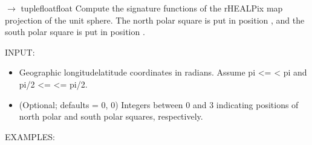 \documentclass[a4paper,12ptopenany,oneside,english]{sphinxmanual}
\begin{document}

\begin{fulllineitems}
\label{\detokenize{pj_rhealpix:rhealpixdggs.pj_rhealpix.rhealpix_sphere}}
\pysigstartsignatures
\pysiglinewithargsret
{}
{\sphinxparamcomma {}\sphinxparamcomma {}\sphinxparamcomma {}\sphinxparamcomma {}}
{{ $\rightarrow$ tuple\DUrole{p}{{[}}floatfloat\DUrole{p}{{]}}}}
\pysigstopsignatures
\sphinxAtStartPar
Compute the signature functions of the rHEALPix map projection of
the unit sphere.
The north polar square is put in position , and the
south polar square is put in position .

\sphinxAtStartPar
INPUT:
\begin{itemize}
\item {} 
\sphinxAtStartPar
{} \sphinxhyphen{}Geographic longitude\sphinxhyphen{}latitude coordinates in radians.
Assume \sphinxhyphen{}pi \textless{}=  \textless{} pi and \sphinxhyphen{}pi/2 \textless{}=  \textless{}= pi/2.

\item {} 
\sphinxAtStartPar
{} \sphinxhyphen{} (Optional; defaults = 0, 0) Integers
between 0 and 3 indicating positions of north polar and
south polar squares, respectively.

\end{itemize}

\sphinxAtStartPar
EXAMPLES:

\begin{sphinxVerbatim}[commandchars=\\\{\}]
      
\end{sphinxVerbatim}


\end{fulllineitems}
\end{document}
